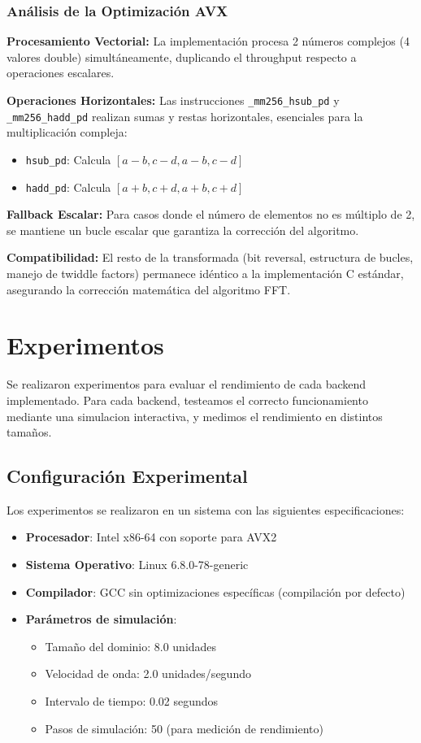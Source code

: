 \documentclass[a4paper]{article}
\begin{document}
\subsubsection{Análisis de la Optimización AVX}

\textbf{Procesamiento Vectorial:} La implementación procesa 2 números complejos (4 valores double) simultáneamente, duplicando el throughput respecto a operaciones escalares.

\textbf{Operaciones Horizontales:} Las instrucciones \texttt{\_mm256\_hsub\_pd} y \texttt{\_mm256\_hadd\_pd} realizan sumas y restas horizontales, esenciales para la multiplicación compleja:
\begin{itemize}
    \item \texttt{hsub\_pd}: Calcula $[a-b, c-d, a-b, c-d]$
    \item \texttt{hadd\_pd}: Calcula $[a+b, c+d, a+b, c+d]$
\end{itemize}

\textbf{Fallback Escalar:} Para casos donde el número de elementos no es múltiplo de 2, se mantiene un bucle escalar que garantiza la corrección del algoritmo.

\textbf{Compatibilidad:} El resto de la transformada (bit reversal, estructura de bucles, manejo de twiddle factors) permanece idéntico a la implementación C estándar, asegurando la corrección matemática del algoritmo FFT.

\section{Experimentos}

Se realizaron experimentos para evaluar el rendimiento de cada backend implementado. Para cada backend, testeamos el correcto funcionamiento mediante una simulacion interactiva, y medimos
el rendimiento en distintos tamaños.

\subsection{Configuración Experimental}

Los experimentos se realizaron en un sistema con las siguientes especificaciones:
\begin{itemize}
    \item \textbf{Procesador}: Intel x86-64 con soporte para AVX2
    \item \textbf{Sistema Operativo}: Linux 6.8.0-78-generic
    \item \textbf{Compilador}: GCC sin optimizaciones específicas (compilación por defecto)
    \item \textbf{Parámetros de simulación}:
          \begin{itemize}
              \item Tamaño del dominio: 8.0 unidades
              \item Velocidad de onda: 2.0 unidades/segundo
              \item Intervalo de tiempo: 0.02 segundos
              \item Pasos de simulación: 50 (para medición de rendimiento)
          \end{itemize}
\end{itemize}
\end{document}
